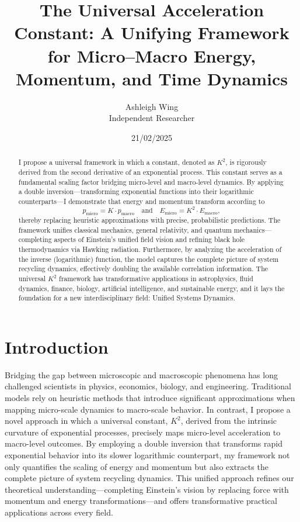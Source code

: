 \documentclass{article}
\title{The Universal Acceleration Constant: A Unifying Framework for Micro--Macro Energy, Momentum, and Time Dynamics}
\author{Ashleigh Wing \\ Independent Researcher}
\date{21/02/2025}
\begin{document}
\maketitle

\begin{abstract}
I propose a universal framework in which a constant, denoted as \(K^2\), is rigorously derived from the second derivative of an exponential process. This constant serves as a fundamental scaling factor bridging micro-level and macro-level dynamics. By applying a double inversion---transforming exponential functions into their logarithmic counterparts---I demonstrate that energy and momentum transform according to
\[
p_{\text{micro}} = K \cdot p_{\text{macro}} \quad \text{and} \quad E_{\text{micro}} = K^2 \cdot E_{\text{macro}},
\]
thereby replacing heuristic approximations with precise, probabilistic predictions. The framework unifies classical mechanics, general relativity, and quantum mechanics---completing aspects of Einstein's unified field vision and refining black hole thermodynamics via Hawking radiation. Furthermore, by analyzing the acceleration of the inverse (logarithmic) function, the model captures the complete picture of system recycling dynamics, effectively doubling the available correlation information. The universal \(K^2\) framework has transformative applications in astrophysics, fluid dynamics, finance, biology, artificial intelligence, and sustainable energy, and it lays the foundation for a new interdisciplinary field: Unified Systems Dynamics.
\end{abstract}

\section{Introduction}
Bridging the gap between microscopic and macroscopic phenomena has long challenged scientists in physics, economics, biology, and engineering. Traditional models rely on heuristic methods that introduce significant approximations when mapping micro-scale dynamics to macro-scale behavior. In contrast, I propose a novel approach in which a universal constant, \(K^2\), derived from the intrinsic curvature of exponential processes, precisely maps micro-level acceleration to macro-level outcomes. By employing a double inversion that transforms rapid exponential behavior into its slower logarithmic counterpart, my framework not only quantifies the scaling of energy and momentum but also extracts the complete picture of system recycling dynamics. This unified approach refines our theoretical understanding---completing Einstein's vision by replacing force with momentum and energy transformations---and offers transformative practical applications across every field.
\end{document}
